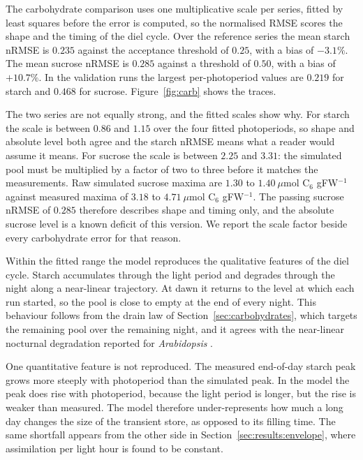 The carbohydrate comparison uses one multiplicative scale per series, fitted
by least squares before the error is computed, so the normalised RMSE scores
the shape and the timing of the diel cycle. Over the reference series the mean
starch nRMSE is $0.235$ against the acceptance threshold of $0.25$, with a bias
of $-3.1\%$. The mean sucrose nRMSE is $0.285$ against a threshold of $0.50$,
with a bias of $+10.7\%$. In the validation runs the largest per-photoperiod
values are $0.219$ for starch and $0.468$ for sucrose. Figure~\ref{fig:carb}
shows the traces.

The two series are not equally strong, and the fitted scales show why. For
starch the scale is between $0.86$ and $1.15$ over the four fitted
photoperiods, so shape and absolute level both agree and the starch nRMSE
means what a reader would assume it means. For sucrose the scale is between
$2.25$ and $3.31$: the simulated pool must be multiplied by a factor of two to
three before it matches the measurements. Raw simulated sucrose maxima are
$1.30$ to $1.40~\mu\mathrm{mol}$ C$_6$ gFW$^{-1}$ against measured maxima of
$3.18$ to $4.71~\mu\mathrm{mol}$ C$_6$ gFW$^{-1}$. The passing sucrose nRMSE
of $0.285$ therefore describes shape and timing only, and the absolute sucrose
level is a known deficit of this version. We report the scale factor beside
every carbohydrate error for that reason.

Within the fitted range the model reproduces the qualitative features of the
diel cycle. Starch accumulates through the light period and degrades through the
night along a near-linear trajectory. At dawn it returns to the level at which
each run started, so the pool is close to empty at the end of every night. This
behaviour follows from the drain law of
Section~\ref{sec:carbohydrates}, which targets the remaining pool over the
remaining night, and it agrees with the near-linear nocturnal degradation
reported for \textit{Arabidopsis} \citep{Graf2010,Scialdone2013}.

One quantitative feature is not reproduced. The measured end-of-day starch
peak grows more steeply with photoperiod than the simulated peak. In the model
the peak does rise with photoperiod, because the light period is longer, but the
rise is weaker than measured. The model therefore under-represents how much a
long day changes the size of the transient store, as opposed to its filling
time. The same shortfall appears from the other side in
Section~\ref{sec:results:envelope}, where assimilation per light hour is found
to be constant.


